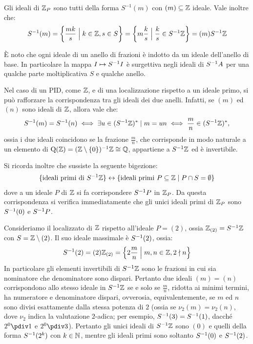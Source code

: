 \documentclass[11pt]{scrartcl}
\begin{document}
	Gli ideali di $\mathbb Z_P$
	sono tutti della forma $S^{-1}(m)$ con $(m)\subseteq \mathbb Z$ ideale. Vale inoltre
	che:
	\[
	S^{-1}(m) = \left\{\frac{mk}{s} \Bigm|k \in \mathbb Z, s \in S\right\} = 
	\left\{m\frac k s\Bigm| \frac k s \in S^{-1}\mathbb Z\right\} = (m)S^{-1}\mathbb Z
	\]
	
	È noto che ogni ideale di un anello di frazioni è indotto da un ideale
	dell'anello di base. In particolare la mappa $I \mapsto S^{-1} I$ è surgettiva
	negli ideali di $S^{-1} A$ per una qualche parte moltiplicativa $S$ e qualche
	anello. \medskip
	
	Nel
	caso di un PID, come $\mathbb Z$, e di una localizzazione rispetto a un ideale primo, si può rafforzare la corrispondenza tra gli ideali dei due anelli. Infatti, se $(m)$ ed $(n)$ sono ideali di $\mathbb Z$,
	allora vale che:
	\[ S^{-1} (m) = S^{-1} (n) \iff \exists u \in (S^{-1} \mathbb Z)^* \mid m = un \iff \frac{m}{n} \in (S^{-1} \mathbb Z)^*, \]
	ossia i due ideali coincidono se la frazione $\frac{m}{n}$, che corrisponde in modo naturale a un elemento di
	$\operatorname{Q}(\mathbb Z) = (\mathbb Z \setminus \{0\})^{-1} \mathbb Z \cong \mathbb Q$, appartiene a $S^{-1} \mathbb Z$ ed è invertibile. \medskip
	
	Si ricorda inoltre che sussiste la seguente bigezione:
	\[
	\{\text{ideali primi di }S^{-1}\mathbb Z\} \leftrightarrow 
	\{\text{ideali primi } P\subseteq \mathbb Z \mid P \cap S = \emptyset\}
	\]
	dove a un ideale $P$ di $\mathbb Z$ si fa corrispondere $S^{-1} P$ in
	$\mathbb Z_P$. Da questa corrispondenza si verifica immediatamente che gli
	unici ideali primi di $\mathbb Z_P$ sono $S^{-1} (0)$ e $S^{-1} P$.
	
	\begin{remark}[Localizzazione rispetto a $P = (2)$]
		Consideriamo il localizzato di $\mathbb Z$ rispetto all'ideale $P = (2)$, ossia
		$\mathbb Z_{(2)} = S^{-1} \mathbb Z$ con $S = \mathbb Z \setminus (2)$. Il suo ideale massimale
		è $S^{-1} (2)$, ossia:
		\[ S^{-1} (2) = (2) \mathbb Z_{(2)} = \left\{ 2 \frac{m}{n} \Bigm| m, n \in \mathbb Z, 2 \nmid n \right\} \]
		In particolare gli elementi invertibili di $S^{-1} \mathbb Z$ sono le frazioni
		in cui sia nominatore che denominatore sono dispari. Pertanto due ideali
		$(m) = (n)$ corrispondono allo stesso ideale in $S^{-1} \mathbb Z$ se e solo
		se $\frac{m}{n}$, ridotta ai minimi termini, ha numeratore e denominatore
		dispari, ovverosia, equivalentemente, se $m$ ed $n$ sono divisi esattamente
		dalla stessa potenza di $2$ (ossia se $\nu_2(m) = \nu_2(n)$, dove
		$\nu_2$ indica la valutazione $2$-adica; per esempio, $S^{-1} (3) = S^{-1} (1)$, dacché $2^0 \pdiv 1$ e $2^0 \pdiv 3$).
		Pertanto gli unici ideali di $S^{-1} \mathbb Z$ sono $(0)$ e quelli della
		forma $S^{-1} (2^k)$ con $k \in \mathbb N$, mentre gli ideali primi sono
		soltanto $S^{-1} (0)$ e $S^{-1} (2)$.
	\end{remark}
\end{document}
